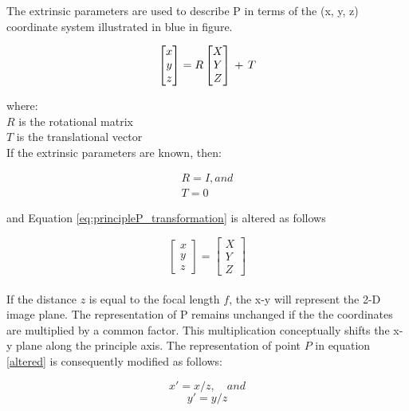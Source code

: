 The extrinsic parameters are used to describe P in terms of the (x, y, z) coordinate system illustrated in blue in figure.

\begin{equation}\label{eq:principleP_transformation}
\begin{bmatrix}{x}\\{y}\\{z}\end{bmatrix} = R  \begin{bmatrix}{X}\\{Y}\\{Z}\end{bmatrix}\,+\,T\\
\end{equation}

where:\\
$R$ is the rotational matrix\\
$T$ is the translational vector\\

If the extrinsic parameters are known, then:

\begin{align*}
R = I, and\\
T = 0
\end{align*}

and Equation \ref{eq:principleP_transformation} is altered as follows 

\begin{equation}\label{altered}
\begin{bmatrix}{x}\\{y}\\{z}\end{bmatrix} =  \begin{bmatrix}{X}\\{Y}\\{Z}\end{bmatrix}
\end{equation}\\

If the distance $z$ is equal to the focal length $f$, the x-y will represent the 2-D image plane. The representation of P remains unchanged if the the coordinates are multiplied by a common factor. This multiplication conceptually shifts the x-y plane along the principle axis. The representation of point $P$ in equation \ref{altered} is consequently modified as follows:

\begin{equation}x' = x/z,\quad and \end{equation}
\begin{equation}y' = y/z \end{equation}

